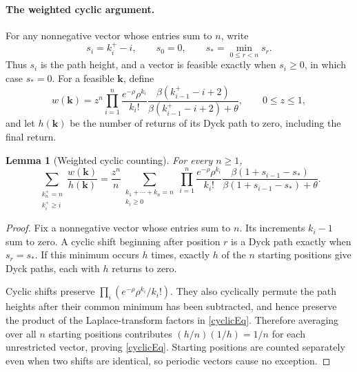\documentclass[11pt]{article}
\newtheorem{lemma}{Lemma}
\begin{document}
\paragraph{The weighted cyclic argument.}
For any nonnegative vector whose entries sum to $n$, write
\[
s_i=k_i^+-i,\qquad s_0=0,\qquad s_*=\min_{0\le r<n}s_r.
\]
Thus $s_i$ is the path height, and a vector is feasible exactly when
$s_i\ge0$, in which case $s_*=0$. For a feasible $\mathbf k$, define
\begin{equation}\label{weight}
w(\mathbf k)=z^n\prod_{i=1}^n
\frac{e^{-\rho}\rho^{k_i}}{k_i!}
\frac{\beta(k_{i-1}^+-i+2)}{\beta(k_{i-1}^+-i+2)+\theta},
\qquad 0\le z\le1,
\end{equation}
and let $h(\mathbf k)$ be the number of returns of its Dyck path to
zero, including the final return.

\begin{lemma}[Weighted cyclic counting]\label{cyclicLemma}
For every $n\ge1$,
\begin{equation}\label{cyclicEq}
\sum_{\substack{k_n^+=n\\k_i^+\ge i}}
\frac{w(\mathbf k)}{h(\mathbf k)}
=\frac{z^n}{n}
\sum_{\substack{k_1+\cdots+k_n=n\\k_i\ge0}}
\prod_{i=1}^n\frac{e^{-\rho}\rho^{k_i}}{k_i!}
\frac{\beta(1+s_{i-1}-s_*)}
{\beta(1+s_{i-1}-s_*)+\theta}.
\end{equation}
\end{lemma}
\begin{proof}
Fix a nonnegative vector whose entries sum to $n$. Its increments
$k_i-1$ sum to zero. A cyclic shift beginning after position $r$ is a
Dyck path exactly when $s_r=s_*$. If this minimum occurs $h$ times, exactly $h$
of the $n$ starting positions give Dyck paths, each with $h$ returns
to zero.

Cyclic shifts preserve $\prod_i(e^{-\rho}\rho^{k_i}/k_i!)$.
They also cyclically permute the path heights after their common
minimum has been subtracted, and hence preserve the product of the
Laplace-transform factors in \eqref{cyclicEq}. Therefore averaging
over all $n$ starting positions contributes $(h/n)(1/h)=1/n$ for
each unrestricted vector, proving \eqref{cyclicEq}. Starting positions
are counted separately even when two shifts are identical, so periodic
vectors cause no exception.
\end{proof}
\end{document}
